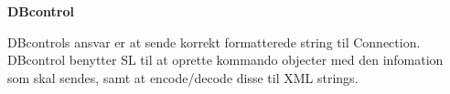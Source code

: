 \textbf{DBcontrol}

DBcontrols ansvar er at sende korrekt formatterede string til Connection. DBcontrol benytter \gls{SL} til at oprette kommando objecter med den infomation som skal sendes, samt at encode/decode disse til XML strings.

\bigskip